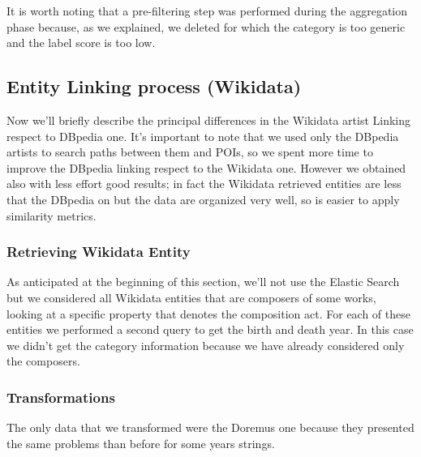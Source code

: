 \documentclass[paper=a4, fontsize=11pt]{scrartcl}
\begin{document}
It is worth noting that a pre-filtering step was performed during the aggregation phase because, as we explained, we deleted for which the category is too generic and the label score is too low.

\subsection{Entity Linking process (Wikidata)}

Now we'll briefly describe the principal differences in the Wikidata artist Linking respect to DBpedia one. It's important to note that we used only the DBpedia artists to search paths between them and POIs, so we spent more time to improve the DBpedia linking respect to the Wikidata one. However we obtained also with less effort good results; in fact the Wikidata retrieved entities are less that the DBpedia on but the data are organized very well, so is easier to apply similarity metrics.


\subsubsection{Retrieving Wikidata Entity}
As anticipated at the beginning of this section, we'll not use the Elastic Search but we considered all Wikidata entities that are composers of some works, looking at a specific property that denotes the composition act. For each of these entities we performed a second query to get the birth and death year. In this case we didn't get the category information because we have already considered only the composers.

\subsubsection{Transformations}
The only data that we transformed were the Doremus one because they presented the same problems than before for some years strings. 
\end{document}
